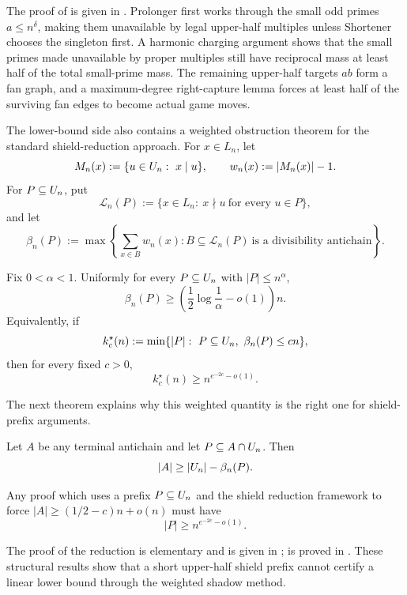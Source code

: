 The proof of  is given in
.  Prolonger first works through the small odd primes
$a\le n^\delta$, making them unavailable by legal upper-half multiples unless
Shortener chooses the singleton first.  A harmonic charging argument shows that
the small primes made unavailable by proper multiples still have reciprocal
mass at least half of the total small-prime mass.  The remaining upper-half
targets $ab$ form a fan graph, and a maximum-degree right-capture lemma forces
at least half of the surviving fan edges to become actual game moves.

The lower-bound side also contains a weighted obstruction theorem for the
standard shield-reduction approach.  For $x\in L_n$, let
\[
  M_n(x):=\{u\in U_n:\ x\mid u\},\qquad
  w_n(x):=|M_n(x)|-1.
\]
For $P\subseteq U_n$, put
\[
  \mathcal L_n(P):=\{x\in L_n:\ x\nmid u\ \text{for every }u\in P\},
\]
and let
\[
  \beta_n(P):=\max\left\{\sum_{x\in B}w_n(x):
    B\subseteq\mathcal L_n(P)\ \text{is a divisibility antichain}\right\}.
\]

\begin{theorem}\label{thm:intro-A}
Fix $0<\alpha<1$.  Uniformly for every $P\subseteq U_n$ with
$|P|\le n^\alpha$,
\[
  \beta_n(P)\ge
  \left(\frac12\log\frac1\alpha-o(1)\right)n.
\]
Equivalently, if
\[
  k_c^\star(n):=\min\{|P|:\ P\subseteq\U_n,\ \beta_n(P)\le cn\},
\]
then for every fixed $c>0$,
\[
  k_c^\star(n)\ge n^{e^{-2c}-o(1)}.
\]
\end{theorem}

The next theorem explains why this weighted quantity is the right one for
shield-prefix arguments.

\begin{theorem}\label{thm:intro-shield}
Let $A$ be any terminal antichain and let $P\subseteq A\cap U_n$.  Then
\[
  |A|\ge |U_n|-\beta_n(P).
\]
\end{theorem}

\begin{corollary}\label{cor:intro-shield-obstruction}
Any proof which uses a prefix $P\subseteq U_n$ and the shield reduction
framework to force $|A|\ge (1/2-c)n+o(n)$ must have
\[
  |P|\ge n^{e^{-2c}-o(1)}.
\]
\end{corollary}

The proof of the reduction is elementary and is given in ;
 is proved in .  These structural
results show that a short upper-half shield prefix cannot certify a linear
lower bound through the weighted shadow method.

